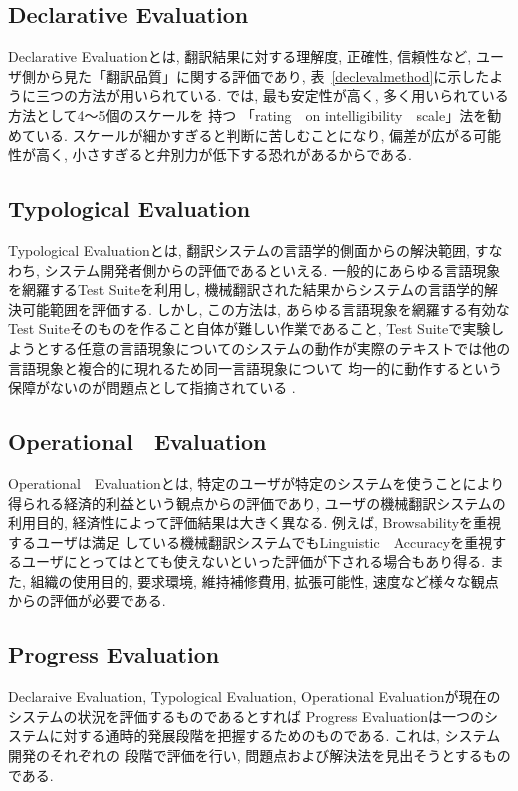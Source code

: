 \subsection{Declarative Evaluation}
 Declarative Evaluationとは, 翻訳結果に対する理解度, 正確性, 信頼性など, ユーザ側から見た「翻訳品質」に関する評価であり, 
表~\ref{declevalmethod}に示したように三つの方法が用いられている. \cite{dijk}では, 最も安定性が高く, 多く用いられている方法として4〜5個のスケールを
持つ  「rating　on intelligibility　scale」法を勧めている. スケールが細かすぎると判断に苦しむことになり, 偏差が広がる可能性が高く, 
小さすぎると弁別力が低下する恐れがあるからである. 

\subsection{Typological Evaluation}
Typological Evaluationとは, 翻訳システムの言語学的側面からの解決範囲, すなわち, システム開発者側からの評価であるといえる. 
一般的にあらゆる言語現象を網羅するTest Suiteを利用し, 機械翻訳された結果からシステムの言語学的解決可能範囲を評価する. 
しかし, この方法は, あらゆる言語現象を網羅する有効なTest Suiteそのものを作ること自体が難しい作業であること,  Test Suiteで実験し
ようとする任意の言語現象についてのシステムの動作が実際のテキストでは他の言語現象と複合的に現れるため同一言語現象について
均一的に動作するという保障がないのが問題点として指摘されている \cite{king,arnold}. 

\subsection{Operational　Evaluation}
Operational　Evaluationとは, 特定のユーザが特定のシステムを使うことにより得られる経済的利益という観点からの評価であり, 
ユーザの機械翻訳システムの利用目的, 経済性によって評価結果は大きく異なる. 例えば, Browsabilityを重視するユーザは満足
している機械翻訳システムでもLinguistic　Accuracyを重視するユーザにとってはとても使えないといった評価が下される場合もあり得る. 
また, 組織の使用目的, 要求環境, 維持補修費用, 拡張可能性, 速度など様々な観点からの評価が必要である. 

\subsection{Progress Evaluation}
Declaraive Evaluation, Typological Evaluation, Operational Evaluationが現在のシステムの状況を評価するものであるとすれば
Progress Evaluationは一つのシステムに対する通時的発展段階を把握するためのものである. これは, システム開発のそれぞれの
段階で評価を行い, 問題点および解決法を見出そうとするものである. 

